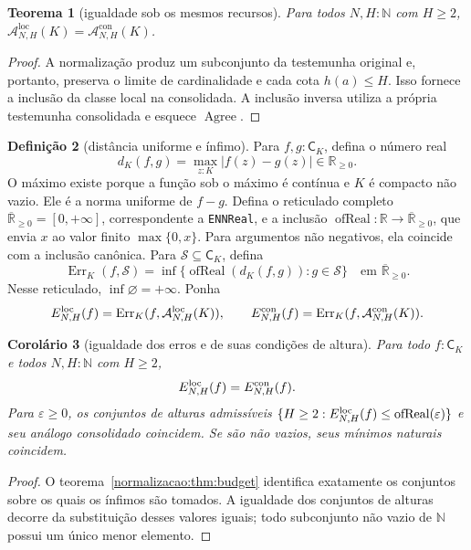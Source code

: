 \documentclass[12pt,a4paper]{article}
\theoremstyle{preciso}
\newtheorem{teorema}{Teorema}[section]
\newtheorem{corolario}[teorema]{Corolário}
\theoremstyle{definition}
\newtheorem{definicao}[teorema]{Definição}
\newcommand{\N}{\mathbb N}
\newcommand{\R}{\mathbb R}
\newcommand{\CK}{\mathsf C_K}
\newcommand{\Agree}{\operatorname{Agree}}
\newcommand{\Aloc}{\mathcal A^{\mathrm{loc}}}
\newcommand{\Astr}{\mathcal A^{\mathrm{con}}}
\newcommand{\ERealPos}{\overline{\R}_{\ge0}}
\newcommand{\code}[1]{\nolinkurl{#1}}
\theoremstyle{preciso}
\theoremstyle{preciso}
\theoremstyle{preciso}
\theoremstyle{preciso}
\theoremstyle{definition}
\theoremstyle{preciso}
\theoremstyle{definition}
\theoremstyle{preciso}
\theoremstyle{preciso}
\theoremstyle{definition}
\begin{document}
\begin{teorema}[igualdade sob os mesmos recursos]\label{map:normalizacao:6.2}\label{normalizacao:thm:budget}
Para todos $N,H:\N$ com $H\ge2$,
$\Aloc_{N,H}(K)=\Astr_{N,H}(K)$.
\end{teorema}
\begin{proof}
A normalização produz um subconjunto da testemunha original e, portanto,
preserva o limite de cardinalidade e cada cota $h(a)\le H$.
Isso fornece a inclusão da classe local na consolidada. A inclusão inversa utiliza
a própria testemunha consolidada e esquece $\Agree$.
\end{proof}

\begin{definicao}[distância uniforme e ínfimo]\label{map:normalizacao:6.3}
Para $f,g:\CK$, defina o número real
\[
 d_K(f,g)=\max_{z:K}|f(z)-g(z)|\in\R_{\ge0}.
\]
O máximo existe porque a função sob o máximo é contínua e $K$ é
compacto não vazio. Ele é a norma uniforme de $f-g$.
Defina o reticulado completo
$\ERealPos=[0,+\infty]$, correspondente a \code{ENNReal}, e a inclusão
$\operatorname{ofReal}:\R\to\ERealPos$, que envia $x$ ao
valor finito $\max\{0,x\}$. Para argumentos não negativos, ela
coincide com a inclusão canônica.
Para $\mathcal S\subseteq\CK$, defina
\[
 \operatorname{Err}_K(f,\mathcal S)=
 \inf\{\operatorname{ofReal}(d_K(f,g)):g\in\mathcal S\}
 \quad\text{em }\ERealPos.
\]
Nesse reticulado, $\inf\varnothing=+\infty$. Ponha
\[
 E^{\rm loc}_{N,H}(f)=\operatorname{Err}_K(f,\Aloc_{N,H}(K)),\qquad
 E^{\rm con}_{N,H}(f)=\operatorname{Err}_K(f,\Astr_{N,H}(K)).
\]
\end{definicao}

\begin{corolario}[igualdade dos erros e de suas condições de altura]\label{map:normalizacao:6.4}
Para todo $f:\CK$ e todos $N,H:\N$ com $H\ge2$,
\[
 E^{\rm loc}_{N,H}(f)=E^{\rm con}_{N,H}(f).
\]
Para $\varepsilon\ge0$, os conjuntos de alturas admissíveis
$\{H\ge2:E^{\rm loc}_{N,H}(f)\le\operatorname{ofReal}(\varepsilon)\}$
e seu análogo consolidado coincidem. Se são não vazios, seus mínimos
naturais coincidem.
\end{corolario}
\begin{proof}
O teorema~\ref{normalizacao:thm:budget} identifica exatamente os conjuntos sobre
os quais os ínfimos são tomados. A igualdade dos conjuntos de alturas
decorre da substituição desses valores iguais; todo subconjunto não vazio
de $\N$ possui um único menor elemento.
\end{proof}
\end{document}

